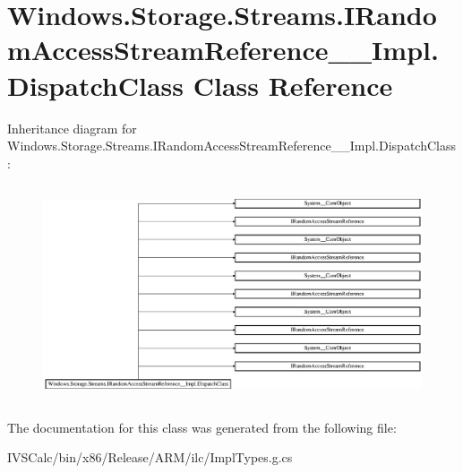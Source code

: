 \hypertarget{class_windows_1_1_storage_1_1_streams_1_1_i_random_access_stream_reference_____impl_1_1_dispatch_class}{}\section{Windows.\+Storage.\+Streams.\+I\+Random\+Access\+Stream\+Reference\+\_\+\+\_\+\+Impl.\+Dispatch\+Class Class Reference}
\label{class_windows_1_1_storage_1_1_streams_1_1_i_random_access_stream_reference_____impl_1_1_dispatch_class}
Inheritance diagram for Windows.\+Storage.\+Streams.\+I\+Random\+Access\+Stream\+Reference\+\_\+\+\_\+\+Impl.\+Dispatch\+Class\+:\begin{figure}[H]
\begin{center}
\leavevmode
\includegraphics[height=6.430063cm]{class_windows_1_1_storage_1_1_streams_1_1_i_random_access_stream_reference_____impl_1_1_dispatch_class}
\end{center}
\end{figure}


The documentation for this class was generated from the following file\+:\begin{DoxyCompactItemize}
\item 
I\+V\+S\+Calc/bin/x86/\+Release/\+A\+R\+M/ilc/Impl\+Types.\+g.\+cs\end{DoxyCompactItemize}
